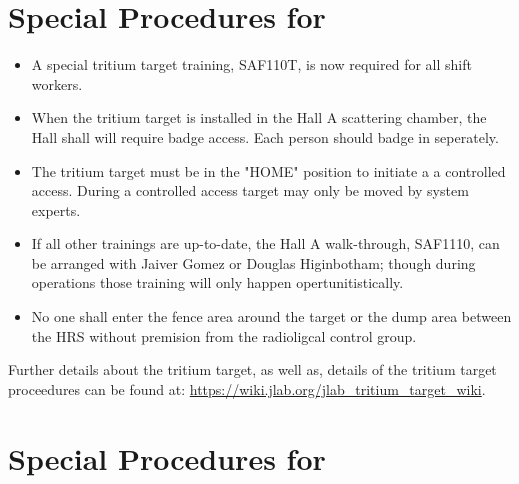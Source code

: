 
%
%
\newpage
\section{Special Procedures for \HALL}

\begin{itemize}

\item{
A special tritium target training, SAF110T, is now required for all shift workers.
}

\item{
When the tritium target is installed in the Hall A scattering chamber, the Hall shall
will require badge access.   Each person should badge in seperately.
}

\item{
The tritium target must be in the "HOME" position to initiate a a controlled access.
During a controlled access target may only be moved by system experts.
}

\item{
If all other trainings are up-to-date, the Hall A walk-through, SAF1110, can be arranged 
with Jaiver Gomez or Douglas Higinbotham; though during operations those training will only 
happen opertunitistically.   
}

\item{
No one shall enter the fence area around the target or the dump area between the HRS without
premision from the radioligcal control group.  
}

\end{itemize}

Further details about the tritium target, as well as, details of the tritium target proceedures
can be found at: \url{https://wiki.jlab.org/jlab_tritium_target_wiki}.
 


%
%
\section{Special Procedures for \EXPTS}

